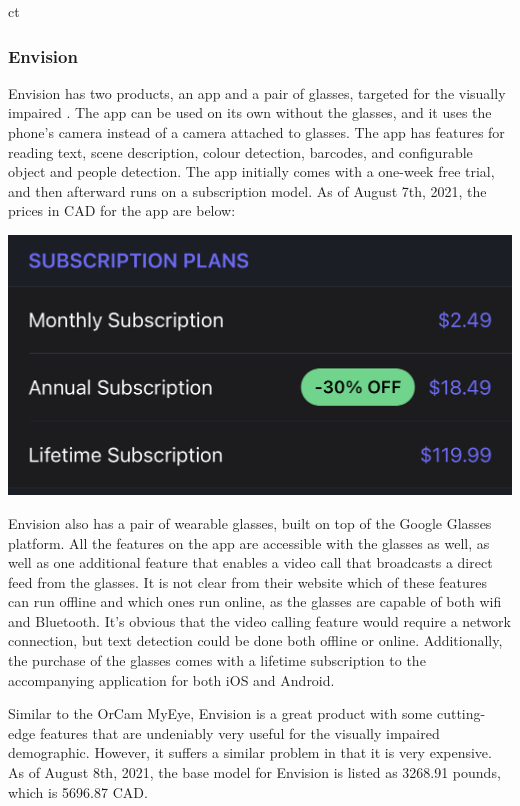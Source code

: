 ct\documentclass[a4paper,11pt]{article}
\begin{document}
\subsubsection{Envision}
Envision has two products, an app and a pair of glasses, targeted for the visually impaired \cite{envision}. The app can be used on its own without the glasses, and it uses the phone's camera instead of a camera attached to glasses. The app has features for reading text, scene description, colour detection, barcodes, and configurable object and people detection. The app initially comes with a one-week free trial, and then afterward runs on a subscription model. As of August 7th, 2021, the prices in CAD for the app are below:
\begin{center}
    \includegraphics[width={0.7\linewidth}]{img/envision_app_price.jpeg}
\end{center}

Envision also has a pair of wearable glasses, built on top of the Google Glasses platform. All the features on the app are accessible with the glasses as well, as well as one additional feature that enables a video call that broadcasts a direct feed from the glasses. It is not clear from their website which of these features can run offline and which ones run online, as the glasses are capable of both wifi and Bluetooth. It's obvious that the video calling feature would require a network connection, but text detection could be done both offline or online. Additionally, the purchase of the glasses comes with a lifetime subscription to the accompanying application for both iOS and Android.

Similar to the OrCam MyEye, Envision is a great product with some cutting-edge features that are undeniably very useful for the visually impaired demographic. However, it suffers a similar problem in that it is very expensive. As of August 8th, 2021, the base model for Envision is listed as 3268.91 pounds, which is 5696.87 CAD.
\end{document}
